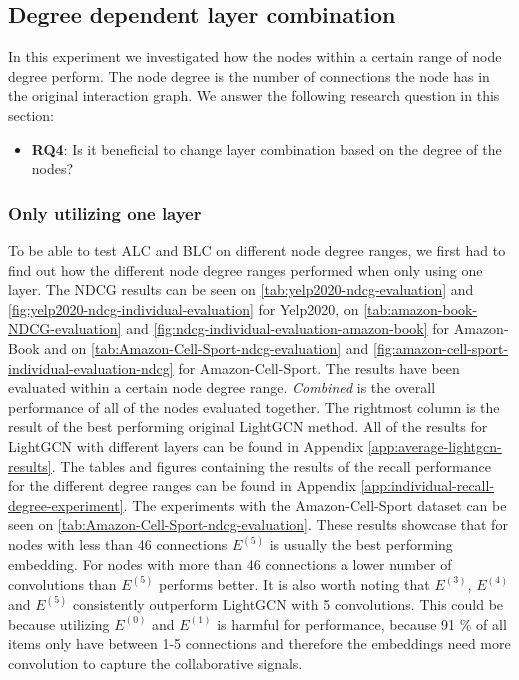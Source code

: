 \subsection{Degree dependent layer combination}\label{subsec:degree-experiment}
In this experiment we investigated how the nodes within a certain range of node degree perform.
The node degree is the number of connections the node has in the original interaction graph.
We answer the following research question in this section:
\begin{itemize}
    \item \textbf{RQ4}: Is it beneficial to change layer combination based on the degree of the nodes?
\end{itemize}

\subsubsection{Only utilizing one layer}
To be able to test ALC and BLC on different node degree ranges, we first had to find out how the different node degree ranges performed when only using one layer.
The NDCG results can be seen on \autoref{tab:yelp2020-ndcg-evaluation} and \autoref{fig:yelp2020-ndcg-individual-evaluation}  for Yelp2020, on \autoref{tab:amazon-book-NDCG-evaluation} and \autoref{fig:ndcg-individual-evaluation-amazon-book} for Amazon-Book  and on \autoref{tab:Amazon-Cell-Sport-ndcg-evaluation} and \autoref{fig:amazon-cell-sport-individual-evaluation-ndcg}  for Amazon-Cell-Sport.
The results have been evaluated within a certain node degree range.
\textit{Combined} is the overall performance of all of the nodes evaluated together.
The rightmost column is the result of the best performing original LightGCN method.
All of the results for LightGCN with different layers can be found in Appendix \ref{app:average-lightgcn-results}.
The tables and figures containing the results of the recall performance for the different degree ranges can be found in Appendix \ref{app:individual-recall-degree-experiment}.
The experiments with the Amazon-Cell-Sport dataset can be seen on \autoref{tab:Amazon-Cell-Sport-ndcg-evaluation}.
These results showcase that for nodes with less than 46 connections $E^{(5)}$ is usually the best performing embedding.
For nodes with more than 46 connections a lower number of convolutions than $E^{(5)}$ performs better.
It is also worth noting that $E^{(3)}$, $E^{(4)}$ and $E^{(5)}$ consistently outperform LightGCN with 5 convolutions.
This could be because utilizing $E^{(0)}$ and $E^{(1)}$ is harmful for performance, because 91 \% of all items only have between 1-5 connections and therefore the embeddings need more convolution to capture the collaborative signals.
